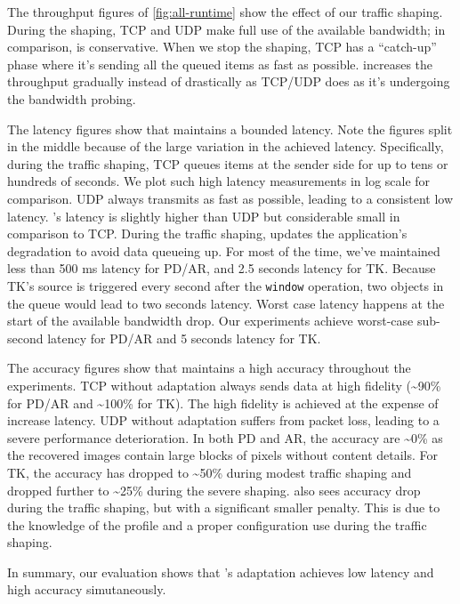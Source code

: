 The throughput figures of \autoref{fig:all-runtime} show the effect of our
traffic shaping. During the shaping, TCP and UDP make full use of the available
bandwidth; in comparison, \sysname{} is conservative. When we stop the shaping,
TCP has a ``catch-up'' phase where it's sending all the queued items as fast as
possible. \sysname{} increases the throughput gradually instead of drastically
as TCP/UDP does as it's undergoing the bandwidth probing.

The latency figures show that \sysname{} maintains a bounded latency. Note the
figures split in the middle because of the large variation in the achieved
latency. Specifically, during the traffic shaping, TCP queues items at the
sender side for up to tens or hundreds of seconds. We plot such high latency
measurements in log scale for comparison. UDP always transmits as fast as
possible, leading to a consistent low latency. \sysname{}'s latency is slightly
higher than UDP but considerable small in comparison to TCP. During the traffic
shaping, \sysname{} updates the application's degradation to avoid data queueing
up. For most of the time, we've maintained less than 500 ms latency for PD/AR,
and 2.5 seconds latency for TK. Because TK's source is triggered every second
after the \texttt{window} operation, two objects in the queue would lead to two
seconds latency. Worst case latency happens at the start of the available
bandwidth drop. Our experiments achieve worst-case sub-second latency for PD/AR
and 5 seconds latency for TK.

The accuracy figures show that \sysname{} maintains a high accuracy throughout
the experiments. TCP without adaptation always sends data at high fidelity
(\textasciitilde 90\% for PD/AR and \textasciitilde 100\% for TK). The high
fidelity is achieved at the expense of increase latency. UDP without adaptation
suffers from packet loss, leading to a severe performance deterioration.  In
both PD and AR, the accuracy are \textasciitilde 0\% as the recovered images
contain large blocks of pixels without content details. For TK, the accuracy has
dropped to \textasciitilde 50\% during modest traffic shaping and dropped
further to \textasciitilde 25\% during the severe shaping. \sysname{} also sees
accuracy drop during the traffic shaping, but with a significant smaller
penalty. This is due to the knowledge of the profile and a proper configuration
use during the traffic shaping.

In summary, our evaluation shows that \sysname{}'s adaptation achieves low
latency and high accuracy simutaneously.

